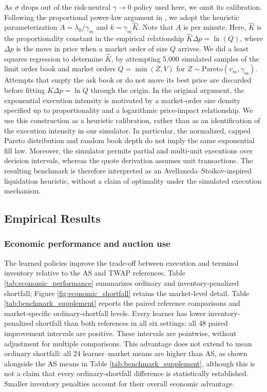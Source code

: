 \documentclass[11pt]{article}
\begin{document}
As $\sigma$ drops out of the risk-neutral $\gamma\to0$ policy used here, we omit its calibration. Following the proportional power-law argument in \cite{avellaneda2008high}, we adopt the heuristic parameterization $A=\lambda_0/\gamma_m$ and $k=\gamma_m\hat K$. Note that $A$ is per minute. Here, $\hat{K}$ is the proportionality constant in the empirical relationship $\hat{K}\Delta p = \ln(Q)$, where $\Delta p$ is the move in price when a market order of size $Q$ arrives. We did a least squares regression to determine $\hat{K}$, by attempting 5{,}000 simulated samples of the limit order book and market orders $Q = \min(Z,V)$ for $Z \sim \mathrm{Pareto}(v_m,\gamma_m)$. Attempts that empty the ask book or do not move its best price are discarded before fitting $\hat K\Delta p=\ln Q$ through the origin. In the original argument, the exponential execution intensity is motivated by a market-order size density specified up to proportionality and a logarithmic price-impact relationship. We use this construction as a heuristic calibration, rather than as an identification of the execution intensity in our simulator. In particular, the normalized, capped Pareto distribution and random book depth do not imply the same exponential fill law. Moreover, the simulator permits partial and multi-unit executions over decision intervals, whereas the quote derivation assumes unit transactions. The resulting benchmark is therefore interpreted as an Avellaneda--Stoikov-inspired liquidation heuristic, without a claim of optimality under the simulated execution mechanism.

\begingroup
\subsection{Empirical Results}
\label{subsec:results_exhibits}

\subsubsection{Economic performance and auction use}
The learned policies improve the trade-off between execution and terminal inventory relative to the AS and TWAP references. Table \ref{tab:economic_performance} summarizes ordinary and inventory-penalized shortfall; Figure \ref{fig:economic_shortfall} retains the market-level detail. Table \ref{tab:benchmark_supplement} reports the paired reference comparisons and market-specific ordinary-shortfall levels. Every learner has lower inventory-penalized shortfall than both references in all six settings: all 48 paired improvement intervals are positive. These intervals are pointwise, without adjustment for multiple comparisons. This advantage does not extend to mean ordinary shortfall: all 24 learner--market means are higher than AS, as shown alongside the AS means in Table \ref{tab:benchmark_supplement}, although this is not a claim that every ordinary-shortfall difference is statistically established. Smaller inventory penalties account for their overall economic advantage.\vspace{0.5em}
\end{document}
